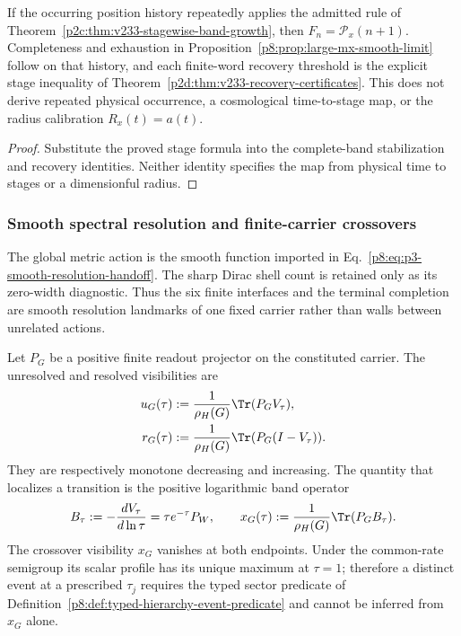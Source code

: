 \documentclass[12pt,a4paper]{article}
\begin{document}
\begin{corollary}
\label{p8:cor:v233-stage-history-specialization}
If the occurring position history repeatedly applies the admitted
rule of Theorem~\ref{p2c:thm:v233-stagewise-band-growth}, then
\(F_n=\mathcal P_x(n+1)\). Completeness and exhaustion in
Proposition~\ref{p8:prop:large-mx-smooth-limit} follow on that
history, and each finite-word recovery threshold is the explicit
stage inequality of Theorem~\ref{p2d:thm:v233-recovery-certificates}.
This does not derive repeated physical occurrence, a cosmological
time-to-stage map, or the radius calibration \(R_x(t)=a(t)\).
\end{corollary}
\begin{proof}
Substitute the proved stage formula into the complete-band
stabilization and recovery identities. Neither identity specifies
the map from physical time to stages or a dimensionful radius.
\end{proof}



\subsubsection{Smooth spectral resolution and finite-carrier crossovers}
\label{p8:subsec:smooth-spectral-crossovers}

The global metric action is the smooth function imported in
Eq.~\eqref{p8:eq:p3-smooth-resolution-handoff}.  The sharp Dirac shell count is
retained only as its zero-width diagnostic.  Thus the six finite interfaces and the terminal completion are smooth resolution landmarks of one fixed carrier rather than walls
between unrelated actions.

\begin{definition}
\label{p8:def:nR-paper6-resolution-meaning}
Let \(P_G\) be a positive finite readout projector on the constituted carrier.  The unresolved and resolved visibilities are
\begin{align}
\label{p8:eq:finite-readout-visibility}
 u_G(\tau)&:=\frac1{\rho_H(G)}\Tr(P_GV_\tau),\\
 r_G(\tau)&:=\frac1{\rho_H(G)}\Tr(P_G(I-V_\tau)).
\end{align}
They are respectively monotone decreasing and increasing.  The quantity that localizes a transition is the positive logarithmic band operator
\begin{equation}
 B_\tau:=-\frac{dV_\tau}{d\ln\tau}
 =\tau e^{-\tau}P_W,
 \qquad
 x_G(\tau):=\frac1{\rho_H(G)}\Tr(P_GB_\tau).
\end{equation}
The crossover visibility \(x_G\) vanishes at both endpoints.  Under the
common-rate semigroup its scalar profile has its unique maximum at \(\tau=1\);
therefore a distinct event at a prescribed \(\tau_j\) requires the typed
sector predicate of Definition~\ref{p8:def:typed-hierarchy-event-predicate}
and cannot be inferred from \(x_G\) alone.
\end{definition}
\end{document}
